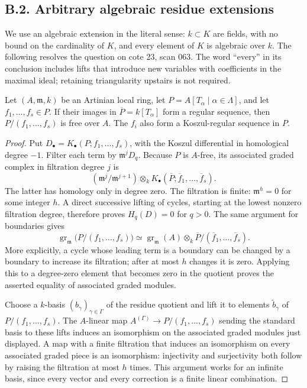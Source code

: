 \subsection{B.2. Arbitrary algebraic residue extensions}

We use an algebraic extension in the literal sense: $k\subset K$ are fields,
with no bound on the cardinality of $K$, and every element of $K$ is algebraic
over $k$.  The following resolves the question on cote 23, scan 063.  The
word ``every'' in its conclusion includes lifts that introduce new variables
with coefficients in the maximal ideal; retaining triangularity upstairs is
not required.

\begin{lemma}\label{SA23-B2-1}
Let $(A,\mathfrak m,k)$ be an Artinian local ring, let
$P=A[T_\alpha\mid\alpha\in\Lambda]$, and let $f_1,\ldots,f_s\in P$.
If their images in $\overline P=k[T_\alpha]$ form a regular sequence, then
$P/(f_1,\ldots,f_s)$ is free over $A$.  The $f_i$ also form a
Koszul-regular sequence in $P$.
\end{lemma}
\begin{proof}
Put $D_\bullet=K_\bullet(P;f_1,\ldots,f_s)$, with the Koszul differential
in homological degree $-1$.  Filter each term by $\mathfrak m^jD_q$.
Because $P$ is $A$-free, its associated graded complex in filtration degree
$j$ is
\[
 (\mathfrak m^j/\mathfrak m^{j+1})\otimes_k
 K_\bullet(\overline P;\overline f_1,\ldots,\overline f_s).
\]
The latter has homology only in degree zero.  The filtration is finite:
$\mathfrak m^h=0$ for some integer $h$.  A direct successive lifting of
cycles, starting at the lowest nonzero filtration degree, therefore proves
$H_q(D)=0$ for $q>0$.  The same argument for boundaries gives
\[
 \operatorname{gr}_{\mathfrak m}\bigl(P/(f_1,\ldots,f_s)\bigr)
 \simeq \operatorname{gr}_{\mathfrak m}(A)
       \otimes_k \overline P/(\overline f_1,\ldots,\overline f_s).
\]
More explicitly, a cycle whose leading term is a boundary can be changed
by a boundary to increase its filtration; after at most $h$ changes it is
zero.  Applying this to a degree-zero element that becomes zero in the
quotient proves the asserted equality of associated graded modules.

Choose a $k$-basis $(b_\gamma)_{\gamma\in\Gamma}$ of the residue quotient
and lift it to elements $\widetilde b_\gamma$ of $P/(f_1,\ldots,f_s)$.
The $A$-linear map $A^{(\Gamma)}\longrightarrow P/(f_1,\ldots,f_s)$
sending the standard basis to these lifts induces an isomorphism on the
associated graded modules just displayed.  A map with a finite filtration
that induces an isomorphism on every associated graded piece is an
isomorphism: injectivity and surjectivity both follow by raising the
filtration at most $h$ times.  This argument works for an infinite basis,
since every vector and every correction is a finite linear combination.
\end{proof}

